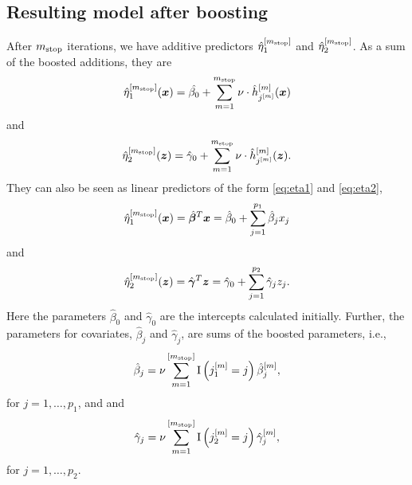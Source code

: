 \subsection{Resulting model after boosting}
After $m_{\text{stop}}$ iterations, we have additive predictors $\hat{\eta}_1^{[m_{\text{stop}}]}$ and $\hat{\eta}_2^{[m_{\text{stop}}]}$.
As a sum of the boosted additions, they are
\begin{equation*}
    \hat{\eta}_1^{[m_{\text{stop}}]}(\bm{x})=\hat{\beta_0}+\sum_{m=1}^{m_{\text{stop}}}\nu\cdot \hat{h}_{j^{[m]}}^{[m]}(\bm{x})
\end{equation*}
and
\begin{equation*}
    \hat{\eta}_2^{[m_{\text{stop}}]}(\bm{z})=\hat{\gamma}_0+\sum_{m=1}^{m_{\text{stop}}}\nu\cdot \hat{h}_{j^{[m]}}^{[m]}(\bm{z}).
\end{equation*}
They can also be seen as linear predictors of the form \eqref{eq:eta1} and \eqref{eq:eta2},
\begin{equation*}
    \hat{\eta}_1^{[m_{\text{stop}}]}(\bm{x})=\hat{\boldsymbol{\beta}}^T\bm{x}=\hat{\beta}_0+\sum_{j=1}^{p_1}\hat{\beta}_jx_j
\end{equation*}
and
\begin{equation*}
    \hat{\eta}_2^{[m_{\text{stop}}]}(\bm{z})=\hat{\boldsymbol{\gamma}}^T\bm{z}=\hat{\gamma}_0+\sum_{j=1}^{p_2}\hat{\gamma}_jz_j.
\end{equation*}
Here the parameters $\hat{\beta}_0$ and $\hat{\gamma}_0$ are the intercepts calculated initially.
Further, the parameters for covariates, $\hat{\beta}_j$ and $\hat{\gamma}_j$, are sums of the boosted parameters, i.e.,
\begin{equation*}
    \hat{\beta}_j=\nu\sum_{m=1}^{[m_{\text{stop}}]}\operatorname{I}\left(j_1^{[m]}=j\right)\hat{\beta}_j^{[m]},
\end{equation*}
for $j=1,\ldots,p_1$, and
and
\begin{equation*}
    \hat{\gamma}_j=\nu\sum_{m=1}^{[m_{\text{stop}}]}\operatorname{I}\left(j_2^{[m]}=j\right)\hat{\gamma}_j^{[m]},
\end{equation*}
for $j=1,\ldots,p_2$.



